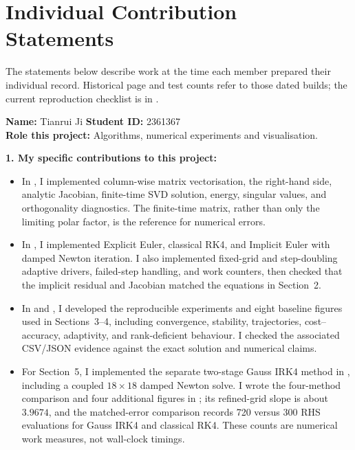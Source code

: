 \clearpage
\section{Individual Contribution Statements}
\label{app:ics}
The statements below describe work at the time each member prepared their
individual record. Historical page and test counts refer to those dated
builds; the current reproduction checklist is in .
\begin{formbox}
\small
\textbf{Name:} Tianrui Ji \hfill \textbf{Student ID:} 2361367\\
\textbf{Role this project:} Algorithms, numerical experiments and visualisation.

\textbf{1. My specific contributions to this project:}

\begin{itemize}[leftmargin=1.4em,itemsep=1pt,topsep=2pt]
    \item In , I implemented column-wise matrix
    vectorisation, the right-hand side, analytic Jacobian, finite-time SVD
    solution, energy, singular values, and orthogonality diagnostics. The
    finite-time matrix, rather than only the limiting polar factor, is the
    reference for numerical errors.
    \item In , I implemented Explicit Euler,
    classical RK4, and Implicit Euler with damped Newton iteration. I also
    implemented fixed-grid and step-doubling adaptive drivers, failed-step
    handling, and work counters, then checked that the implicit residual and
    Jacobian matched the equations in Section~2.
    \item In  and
    , I developed the reproducible experiments
    and eight baseline figures used in Sections~3--4, including convergence,
    stability, trajectories, cost--accuracy, adaptivity, and rank-deficient
    behaviour. I checked the associated CSV/JSON evidence against the exact
    solution and numerical claims.
    \item For Section~5, I implemented the separate two-stage Gauss IRK4
    method in , including a coupled
    $18\times18$ damped Newton solve. I wrote the four-method comparison and
    four additional figures in ; its
    refined-grid slope is about $3.9674$, and the matched-error comparison
    records 720 versus 300 RHS evaluations for Gauss IRK4 and classical RK4.
    These counts are numerical work measures, not wall-clock timings.
\end{itemize}


\end{formbox}
